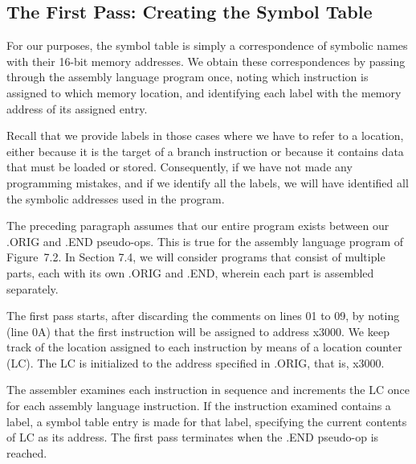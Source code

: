 \documentclass{patt}
\begin{document}
\subsection{The First Pass: Creating the Symbol Table}
\label{sec:symbol_table}
For our purposes, the symbol table is simply a correspondence of
symbolic names with their 16-bit memory addresses.  We obtain these
correspondences by passing through the assembly language program once,
noting which instruction is assigned to which memory location, and 
identifying each label with the memory address of its assigned entry.

Recall that we provide labels in those cases where we have to refer to
a location, either because it is the target of a branch instruction or
because it contains data that must be loaded or stored.  Consequently,
if we have not made any programming mistakes, and if we identify all
the labels, we will have identified all the symbolic addresses used in
the program.

The preceding paragraph assumes that our entire program exists between
our .ORIG and .END pseudo-ops. This is true for the assembly language
program of Figure~7.2.  In Section 7.4, we will consider programs that
consist of multiple parts, each with its own .ORIG and .END, wherein
each part is assembled separately.

The first pass starts, after discarding the comments on lines 01 to
09, by noting (line 0A) that the first instruction will be assigned to
address x3000.  We keep track of the location assigned to each
instruction by means of a location counter (LC).  The LC is
initialized to the address specified in .ORIG, that is, x3000.

The assembler examines each instruction in sequence and increments the
LC once for each assembly language instruction.  If the instruction
examined contains a label, a symbol table entry is made for that
label, specifying the current contents of LC as its address.  The
first pass terminates when the .END pseudo-op is reached. 
\end{document}
